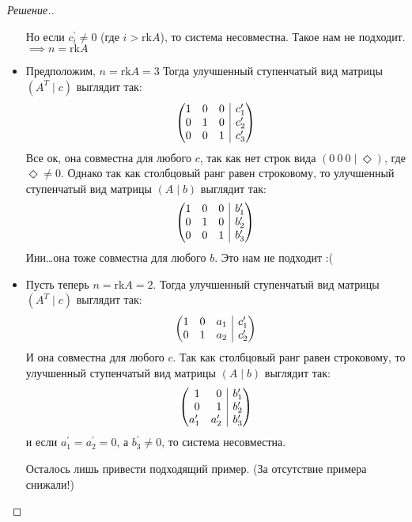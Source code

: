 \documentclass[a4paper]{article}
\makeatletter
\theoremstyle{remark}
\newenvironment{sysmatrix}[1]
{
    \left(\begin{array}{@{}#1@{}}
}
{\end{array}\right)}
\newcommand{\smt}[2]{\begin{sysmatrix}{#1} #2\end{sysmatrix}}
\makeatother
\begin{document}
\begin{proof}[Решение.]
\begin{itemize}
                Но если $c_i^{\prime} \neq 0$ (где $i > \text{rk} A$), то система несовместна. Такое нам не подходит. 
                $\implies n = \text{rk} A$
                \item Предположим, $n = \text{rk} A = 3$ Тогда улучшенный ступенчатый вид матрицы 
                $(A^T \mid c)$ выглядит так:
                \[\smt{rrr|r} {
                    1 & 0 & 0 & c_1^{\prime} \\
                    0 & 1 & 0 & c_2^{\prime} \\
                    0 & 0 & 1 & c_3^{\prime} \\
                }\]
                Все ок, она совместна для любого $c$, так как нет строк вида $(0\ 0\ 0 \mid \Diamond)$, 
                где $\Diamond \neq 0$. Однако так как столбцовый ранг равен строковому, то 
                улучшенный ступенчатый вид матрицы 
                $(A \mid b)$ выглядит так:
                \[\smt{rrr|r} {
                    1 & 0 & 0 & b_1^{\prime} \\
                    0 & 1 & 0 & b_2^{\prime} \\
                    0 & 0 & 1 & b_3^{\prime} \\
                }\]
                Иии\dots она тоже совместна для любого $b$. Это нам не подходит :(

                \item Пусть теперь $n = \text{rk} A = 2$. Тогда улучшенный ступенчатый вид матрицы 
                $(A^T \mid c)$ выглядит так:
                \[\smt{rrr|r} {
                    1 & 0 & a_1 & c_1^{\prime} \\
                    0 & 1 & a_2 & c_2^{\prime} \\
                }\]
                И она совместна для любого $c$. Так как столбцовый ранг равен строковому, то 
                улучшенный ступенчатый вид матрицы 
                $(A \mid b)$ выглядит так:
                \[\smt{rr|r} {
                    1 & 0 & b_1^{\prime} \\
                    0 & 1 & b_2^{\prime} \\
                    a_1^\prime & a_2^\prime & b_3^{\prime} \\
                }\]
                и если $a_1^\prime = a_2^\prime = 0$, а $b_3^{\prime} \neq 0$, то 
                система несовместна. 

                Осталось лишь привести подходящий пример. (За отсутствие примера снижали!)


\end{itemize}
\end{proof}
\end{document}

